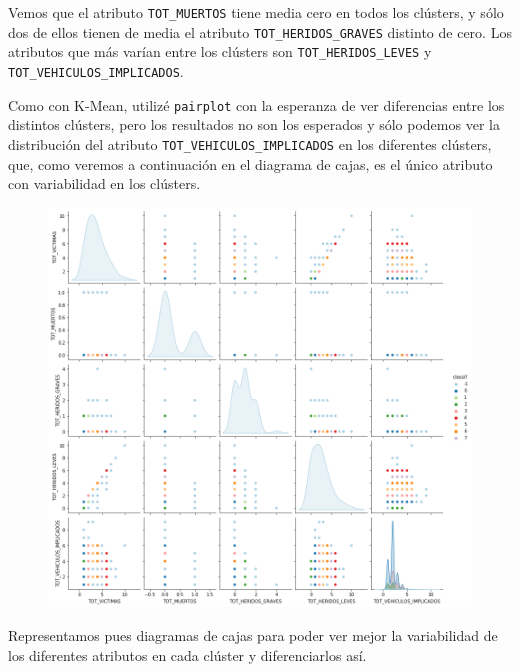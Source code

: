\documentclass[a4]{article}
\begin{document}
Vemos que el atributo \texttt{TOT\_MUERTOS} tiene media cero en todos los clústers, y sólo dos de ellos tienen de media el atributo \texttt{TOT\_HERIDOS\_GRAVES} distinto de cero. Los atributos que más varían entre los clústers son \texttt{TOT\_HERIDOS\_LEVES} y \texttt{TOT\_VEHICULOS\_IMPLICADOS}.

Como con K-Mean, utilizé \texttt{pairplot} con la esperanza de ver diferencias entre los distintos clústers, pero los resultados no son los esperados y sólo podemos ver la distribución del atributo \texttt{TOT\_VEHICULOS\_IMPLICADOS} en los diferentes clústers, que, como veremos a continuación en el diagrama de cajas, es el único atributo con variabilidad en los clústers.

\begin{figure}[H]
  \centering
  \includegraphics[width=180mm]{imagenes/c2_dbscan_pairplot}
\end{figure}

Representamos pues diagramas de cajas para poder ver mejor la variabilidad de los diferentes atributos en cada clúster y diferenciarlos así.
\end{document}
